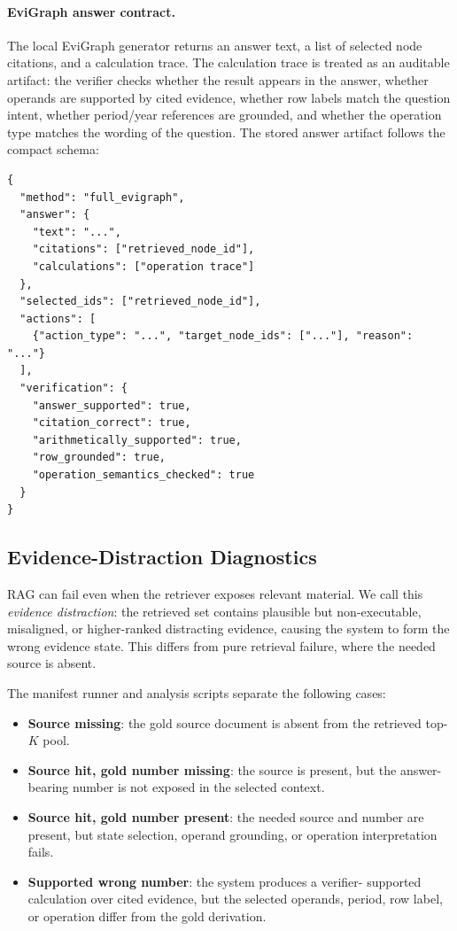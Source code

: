 \paragraph{EviGraph answer contract.}
The local EviGraph generator returns an answer text, a list of selected node
citations, and a calculation trace.  The calculation trace is treated as an
auditable artifact: the verifier checks whether the result appears in the
answer, whether operands are supported by cited evidence, whether row labels
match the question intent, whether period/year references are grounded, and
whether the operation type matches the wording of the question.
The stored answer artifact follows the compact schema:
\begin{verbatim}
{
  "method": "full_evigraph",
  "answer": {
    "text": "...",
    "citations": ["retrieved_node_id"],
    "calculations": ["operation trace"]
  },
  "selected_ids": ["retrieved_node_id"],
  "actions": [
    {"action_type": "...", "target_node_ids": ["..."], "reason": "..."}
  ],
  "verification": {
    "answer_supported": true,
    "citation_correct": true,
    "arithmetically_supported": true,
    "row_grounded": true,
    "operation_semantics_checked": true
  }
}
\end{verbatim}

\subsection{Evidence-Distraction Diagnostics}

RAG can fail even when the retriever exposes relevant material.  We call this
\emph{evidence distraction}: the retrieved set contains plausible but
non-executable, misaligned, or higher-ranked distracting evidence, causing the
system to form the wrong evidence state.  This differs from pure retrieval
failure, where the needed source is absent.

The manifest runner and analysis scripts separate the following cases:
\begin{itemize}
    \item \textbf{Source missing}: the gold source document is absent from the
    retrieved top-\(K\) pool.
    \item \textbf{Source hit, gold number missing}: the source is present, but
    the answer-bearing number is not exposed in the selected context.
    \item \textbf{Source hit, gold number present}: the needed source and
    number are present, but state selection, operand grounding, or operation
    interpretation fails.
    \item \textbf{Supported wrong number}: the system produces a verifier-
    supported calculation over cited evidence, but the selected operands,
    period, row label, or operation differ from the gold derivation.
\end{itemize}

